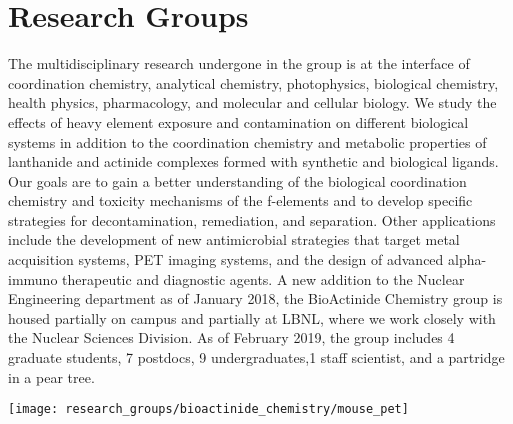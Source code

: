 
\section*{Research Groups}


\begin{minipage}{0.7\textwidth}
	The multidisciplinary research undergone in the group is at the interface of coordination chemistry, analytical chemistry, photophysics, biological chemistry, health physics, pharmacology, and molecular and cellular biology. 
	We study the effects of heavy element exposure and contamination on different biological systems in addition to the coordination chemistry and metabolic properties of lanthanide and actinide complexes formed with synthetic and biological ligands. 
	Our goals are to gain a better understanding of the biological coordination chemistry and toxicity mechanisms of the f-elements and to develop specific strategies for decontamination, remediation, and separation. 
	Other applications include the development of new antimicrobial strategies that target metal acquisition systems, PET imaging systems, and the design of advanced alpha-immuno therapeutic and diagnostic agents. 
	A new addition to the Nuclear Engineering department as of January 2018, the BioActinide Chemistry group is housed partially on campus and partially at LBNL, where we work closely with the Nuclear Sciences Division. 
	As of February 2019, the group includes 4 graduate students, 7 postdocs, 9 undergraduates,1 staff scientist, and a partridge in a pear tree.
\end{minipage}
\begin{minipage}{0.3\textwidth}
	\texttt{[image: research\_groups/bioactinide\_chemistry/mouse\_pet]}
\end{minipage}

